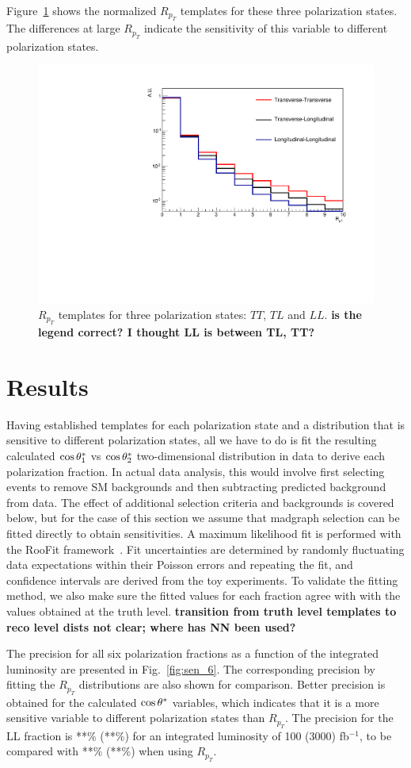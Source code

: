 Figure~\ref{fig:Rpt} shows the normalized $R_{p_T}$ templates for
these three polarization states. The differences at large $R_{p_T}$
indicate the sensitivity of this variable to different polarization
states.
\begin{figure}
\includegraphics[width=.45\textwidth]{./fig/templates_2D.pdf}
\caption{\label{fig:Rpt}$R_{p_T}$ templates for three polarization
  states: $TT$, $TL$ and $LL$. {\bf is the legend correct? I thought
    LL is between TL, TT?}}
\end{figure}

\section{Results}

Having established templates for each polarization state and a
distribution that is sensitive to different polarization states, all
we have to do is fit the resulting calculated $ \cos \theta^{*}  _1$ vs $ \cos \theta^{*}  _2$
two-dimensional distribution in data to derive each polarization
fraction.  In actual data analysis, this would involve first selecting
events to remove SM backgrounds and then subtracting predicted
background from data.  The effect of additional selection criteria and
backgrounds is covered below, but for the case of this section we
assume that {\sc madgraph} selection can be fitted directly to obtain
sensitivities.  A maximum likelihood fit is performed with the RooFit
framework~\cite{aa}. Fit uncertainties are determined by randomly
fluctuating data expectations within their Poisson errors and
repeating the fit, and confidence intervals are derived from the toy
experiments.  To validate the fitting method, we also make sure the
fitted values for each fraction agree with with the values obtained at
the truth level. {\bf transition from truth level templates to reco
  level dists not clear; where has NN been used?}

The precision for all six polarization fractions as a function of the
integrated luminosity are presented in Fig.~\ref{fig:sen_6}.  The
corresponding precision by fitting the $R_{p_T}$ distributions are
also shown for comparison. Better precision is obtained for the
calculated $ \cos \theta^{*}  $ variables, which indicates that it is a more
sensitive variable to different polarization states than $R_{p_T}$.
The precision for the LL fraction is **\% (**\%) for an integrated
luminosity of 100 (3000) fb$^{-1}$, to be compared with **\% (**\%)
when using $R_{p_T}$.

